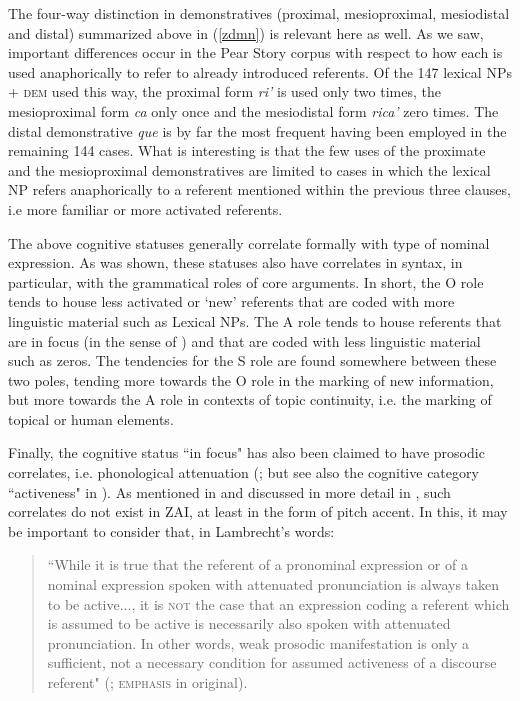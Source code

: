 The four-way distinction in demonstratives (proximal, mesioproximal, mesiodistal and distal) summarized above in (\ref{zdmn}) is relevant here as well. As we saw, important differences occur in the Pear Story corpus with respect to how each is used anaphorically to refer to already introduced referents. Of the 147 lexical NPs + \textsc{dem} used this way, the proximal form \textit{ri'} is used only two times, the mesioproximal form \textit{ca} only once and the mesiodistal form \textit{rica'} zero times. The distal demonstrative \textit{que} is by far the most frequent having been employed in the remaining 144 cases. What is interesting is that the few uses of the proximate and the mesioproximal demonstratives are limited to cases in which the lexical NP refers anaphorically to a referent mentioned within the previous three clauses, i.e more familiar or more activated referents. 

The above cognitive statuses generally correlate formally with type of nominal expression. As was shown, these statuses also have correlates in syntax, in particular, with the grammatical roles of core arguments. In short, the O role tends to house less activated or `new' referents that are coded with more linguistic material such as Lexical NPs. The A role tends to house referents that are in focus (in the sense of \citet{gundel1993}) and that are coded with less linguistic material such as zeros. The tendencies for the S role are found somewhere between these two poles, tending more towards the O role in the marking of new information, but more towards the A role in contexts of topic continuity, i.e. the marking of topical or human elements. 

Finally, the cognitive status ``in focus" has also been claimed to have prosodic correlates, i.e. phonological attenuation (\citealt[285]{gundel1993}; but see also the cognitive category ``activeness" in \citealt{lambrecht1994,ariel1990,ariel2001}). As mentioned in  and discussed in more detail in , such correlates do not exist in ZAI, at least in the form of pitch accent. In this, it may be important to consider that, in Lambrecht's words:

\begin{quote} ``While it is true that the referent of a pronominal expression or of a nominal expression spoken with attenuated pronunciation is always taken to be active..., it is \textsc{not} the case that an expression coding a referent which is assumed to be active is necessarily also spoken with attenuated pronunciation. In other words, weak prosodic manifestation is only a sufficient, not a necessary condition for assumed activeness of a discourse referent" (\citet[97]{lambrecht1994}; \textsc{emphasis} in original).
\end{quote}
 
